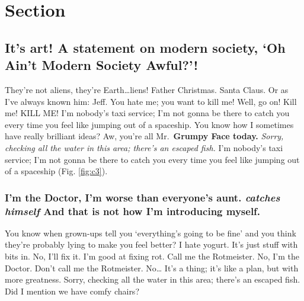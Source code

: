 \documentclass[
]{report}
\begin{document}
\label{chapter-3}

\hypertarget{section-3.1}{%
\section{Section}\label{section-3.1}}

\hypertarget{its-art-a-statement-on-modern-society-oh-aint-modern-society-awful}{%
\subsection{It's art! A statement on modern society, `Oh Ain't Modern
Society
Awful?'!}\label{its-art-a-statement-on-modern-society-oh-aint-modern-society-awful}}

They're not aliens, they're Earth\ldots{}liens! Father Christmas. Santa
Claus. Or as I've always known him: Jeff. You hate me; you want to kill
me! Well, go on! Kill me! KILL ME! I'm nobody's taxi service; I'm not
gonna be there to catch you every time you feel like jumping out of a
spaceship. You know how I sometimes have really brilliant ideas? Aw,
you're all Mr.~\textbf{Grumpy Face today.} \emph{Sorry, checking all the
water in this area; there's an escaped fish.} I'm nobody's taxi service;
I'm not gonna be there to catch you every time you feel like jumping out
of a spaceship (Fig. \ref{fig:c3}).



\hypertarget{im-the-doctor-im-worse-than-everyones-aunt.-catches-himself-and-that-is-not-how-im-introducing-myself.}{%
\subsubsection{\texorpdfstring{I'm the Doctor, I'm worse than everyone's
aunt. \emph{catches himself} And that is not how I'm introducing
myself.}{I'm the Doctor, I'm worse than everyone's aunt. catches himself And that is not how I'm introducing myself.}}\label{im-the-doctor-im-worse-than-everyones-aunt.-catches-himself-and-that-is-not-how-im-introducing-myself.}}

You know when grown-ups tell you `everything's going to be fine' and you
think they're probably lying to make you feel better? I hate yogurt.
It's just stuff with bits in. No, I'll fix it. I'm good at fixing rot.
Call me the Rotmeister. No, I'm the Doctor. Don't call me the
Rotmeister. No\ldots{} It's a thing; it's like a plan, but with more
greatness. Sorry, checking all the water in this area; there's an
escaped fish. Did I mention we have comfy chairs?
\end{document}
